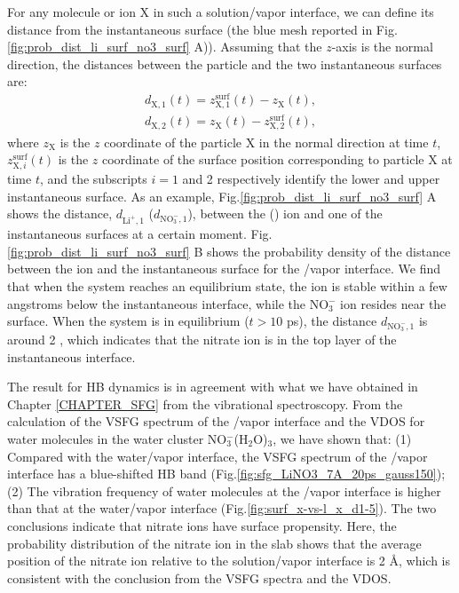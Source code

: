For any molecule or ion X in such a solution/vapor interface, we can define its distance from the instantaneous surface 
(the blue mesh reported in Fig.\thinspace\ref{fig:prob_dist_li_surf_no3_surf} A)).
Assuming that the $z$-axis is the normal direction, the distances between the particle and the two instantaneous surfaces are:
%
\begin{eqnarray}
    d_{\text{X},1}(t)=  z^\text{surf}_{\text{X},1}(t) - z_{\text{X}}(t),\label{eq:distance_particle2surf_1}\\
    d_{\text{X},2}(t)= z_{\text{X}}(t) - z^\text{surf}_{\text{X},2}(t), 
\label{eq:distance_particle2surf_2}
\end{eqnarray}
%
where $z_{\text{X}}$ is the $z$ coordinate of the particle X in the normal direction at time $t$, 
$z^\text{surf}_{\text{X},i}(t)$ is the $z$ coordinate of the surface position corresponding to particle X at time $t$, 
and the subscripts $i=1$ and 2 respectively identify the lower and upper instantaneous surface.
As an example, Fig.\thinspace\ref{fig:prob_dist_li_surf_no3_surf} A shows the distance, 
$d_{\text{Li}^+,1}$ ($d_{\text{NO}_3^-,1}$), between the \Li (\nitrate) ion and one of the instantaneous surfaces at a certain moment.
Fig.\thinspace\ref{fig:prob_dist_li_surf_no3_surf} B shows the probability density of the distance between the ion 
and the instantaneous surface for the \LiN/vapor interface. We find that when the system reaches an equilibrium state, 
the \Li ion is stable within a few angstroms below the instantaneous interface, while the NO$^-_3$ ion resides near the surface. 
When the system is in equilibrium ($t>10$ ps), the distance $d_{\text{NO}_3^-,1}$ is around 2 \A, 
which indicates that the nitrate ion is in the top layer of the instantaneous interface. 

The result for HB dynamics is in agreement with what we have obtained in Chapter \ref{CHAPTER_SFG}  
from the vibrational spectroscopy.
From the calculation of the VSFG spectrum of the \LiN/vapor interface and the VDOS for water molecules in the water cluster NO$^-_3$(H$_2$O)$_3$,
we have shown that: (1) Compared with the water/vapor interface, the VSFG spectrum of the \LiN/vapor interface has a blue-shifted HB band 
(Fig.\thinspace\ref{fig:sfg_LiNO3_7A_20ps_gauss150});
(2) The vibration frequency of water molecules at the \LiN/vapor interface is higher than that at the water/vapor interface (Fig.\thinspace\ref{fig:surf_x-vs-l_x_d1-5}).
The two conclusions indicate that nitrate ions have surface propensity. 
Here, the probability distribution of the nitrate ion in the slab shows that the average position of the nitrate ion relative to the solution/vapor interface is 2 \AA,
which is consistent with the conclusion from the VSFG spectra and the VDOS.
%
